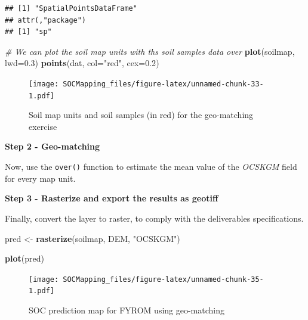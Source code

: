 \documentclass[10pt,b5paper,]{book}
\newenvironment{Shaded}{\begin{snugshade}}{\end{snugshade}}
\newcommand{\CommentTok}[1]{\textcolor[rgb]{0.56,0.35,0.01}{\textit{#1}}}
\newcommand{\DataTypeTok}[1]{\textcolor[rgb]{0.13,0.29,0.53}{#1}}
\newcommand{\DecValTok}[1]{\textcolor[rgb]{0.00,0.00,0.81}{#1}}
\newcommand{\FloatTok}[1]{\textcolor[rgb]{0.00,0.00,0.81}{#1}}
\newcommand{\KeywordTok}[1]{\textcolor[rgb]{0.13,0.29,0.53}{\textbf{#1}}}
\newcommand{\NormalTok}[1]{#1}
\newcommand{\OperatorTok}[1]{\textcolor[rgb]{0.81,0.36,0.00}{\textbf{#1}}}
\newcommand{\StringTok}[1]{\textcolor[rgb]{0.31,0.60,0.02}{#1}}
\theoremstyle{definition}
\theoremstyle{definition}
\theoremstyle{definition}
\theoremstyle{remark}
\begin{document}
\begin{verbatim}
## [1] "SpatialPointsDataFrame"
## attr(,"package")
## [1] "sp"
\end{verbatim}

\begin{Shaded}
\begin{Highlighting}[]
\CommentTok{# We can plot the soil map units with ths soil samples data over}
\KeywordTok{plot}\NormalTok{(soilmap, }\DataTypeTok{lwd=}\FloatTok{0.3}\NormalTok{)}
\KeywordTok{points}\NormalTok{(dat, }\DataTypeTok{col=}\StringTok{"red"}\NormalTok{, }\DataTypeTok{cex=}\FloatTok{0.2}\NormalTok{)}
\end{Highlighting}
\end{Shaded}

\begin{figure}
\centering
\texttt{[image: SOCMapping\_files/figure-latex/unnamed-chunk-33-1.pdf]}
\caption{\label{fig:unnamed-chunk-33}Soil map units and soil samples (in
red) for the geo-matching exercise}
\end{figure}

\textbf{Step 2 - Geo-matching}

Now, use the \texttt{over()} function to estimate the mean value of the
\emph{OCSKGM} field for every map unit.

\begin{Shaded}
\end{Shaded}

\textbf{Step 3 - Rasterize and export the results as geotiff}

Finally, convert the layer to raster, to comply with the deliverables
specifications.

\begin{Shaded}
\begin{Highlighting}[]
\NormalTok{pred <-}\StringTok{ }\KeywordTok{rasterize}\NormalTok{(soilmap, DEM, }\StringTok{"OCSKGM"}\NormalTok{)}

\KeywordTok{plot}\NormalTok{(pred)}
\end{Highlighting}
\end{Shaded}

\begin{figure}
\centering
\texttt{[image: SOCMapping\_files/figure-latex/unnamed-chunk-35-1.pdf]}
\caption{\label{fig:unnamed-chunk-35}SOC prediction map for FYROM using
geo-matching}
\end{figure}
\end{document}
